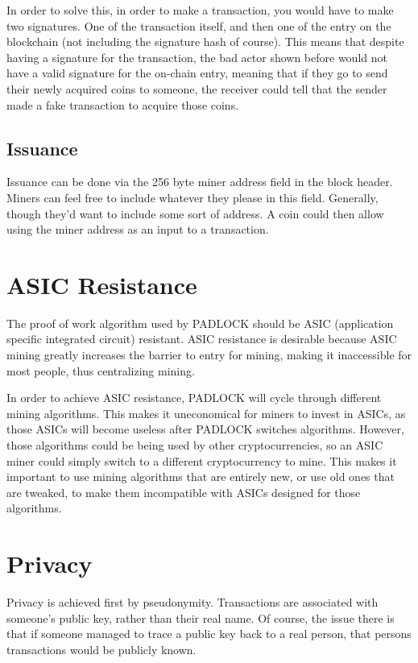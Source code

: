 \documentclass[12pt, letterpaper]{article}
\begin{document}
In order to solve this, in order to make a transaction, you would have to make
two signatures. One of the transaction itself, and then one of the entry on the
blockchain (not including the signature hash of course). This means that
despite having a signature for the transaction, the bad actor shown before would
not have a valid signature for the on-chain entry, meaning that if they go to
send their newly acquired coins to someone, the receiver could tell that the
sender made a fake transaction to acquire those coins.

\subsection{Issuance}
Issuance can be done via the 256 byte miner address field in the block header.
Miners can feel free to include whatever they please in this field. Generally,
though they'd want to include some sort of address. A coin could then allow
using the miner address as an input to a transaction.


\section{ASIC Resistance}
The proof of work algorithm used by PADLOCK should be ASIC (application specific
integrated circuit) resistant. ASIC resistance is desirable because ASIC mining
greatly increases the barrier to entry for mining, making it inaccessible for
most people, thus centralizing mining.

In order to achieve ASIC resistance, PADLOCK will cycle through different mining
algorithms.  This makes it uneconomical for miners to invest in ASICs, as those
ASICs will become useless after PADLOCK switches algorithms. However, those
algorithms could be being used by other cryptocurrencies, so an ASIC miner could
simply switch to a different cryptocurrency to mine. This makes it important to
use mining algorithms that are entirely new, or use old ones that are tweaked,
to make them incompatible with ASICs designed for those algorithms.


\section{Privacy}
Privacy is achieved first by pseudonymity. Transactions are associated with
someone's public key, rather than their real name. Of course, the issue there is
that if someone managed to trace a public key back to a real person, that
persons transactions would be publicly known.
\end{document}
